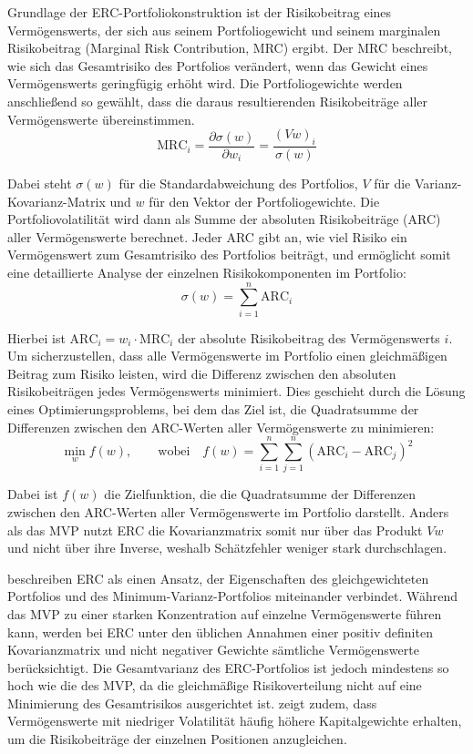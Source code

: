 \documentclass[a4paper, 12pt]{article}
\begin{document}
Grundlage der ERC-Portfoliokonstruktion ist der Risikobeitrag eines Vermögenswerts, der sich aus seinem Portfoliogewicht und seinem marginalen Risikobeitrag (Marginal Risk Contribution, MRC) ergibt.
Der MRC beschreibt, wie sich das Gesamtrisiko des Portfolios verändert, wenn das Gewicht eines Vermögenswerts geringfügig erhöht wird.
Die Portfoliogewichte werden anschließend so gewählt, dass die daraus resultierenden Risikobeiträge aller Vermögenswerte übereinstimmen.
\begin{equation}
	\mathrm{MRC}_i = \frac{\partial \sigma(w)}{\partial w_i} = \frac{(V w)_i}{\sigma(w)}
	\label{eq:erc-mrc}
\end{equation}

Dabei steht $\sigma(w)$ für die Standardabweichung des Portfolios, $V$ für die Varianz-Kovarianz-Matrix und $w$ für den Vektor der Portfoliogewichte.
Die Portfoliovolatilität wird dann als Summe der absoluten Risikobeiträge (ARC) aller Vermögenswerte berechnet.
Jeder ARC gibt an, wie viel Risiko ein Vermögenswert zum Gesamtrisiko des Portfolios beiträgt, und ermöglicht somit eine detaillierte Analyse der einzelnen Risikokomponenten im Portfolio:
\begin{equation}
	\sigma(w) = \sum_{i=1}^{n} \mathrm{ARC}_i
	\label{eq:erc-arc}
\end{equation}

Hierbei ist $\mathrm{ARC}_i = w_i \cdot \mathrm{MRC}_i$ der absolute Risikobeitrag des Vermögenswerts $i$.
Um sicherzustellen, dass alle Vermögenswerte im Portfolio einen gleichmäßigen Beitrag zum Risiko leisten, wird die Differenz zwischen den absoluten Risikobeiträgen jedes Vermögenswerts minimiert.
Dies geschieht durch die Lösung eines Optimierungsproblems, bei dem das Ziel ist, die Quadratsumme der Differenzen zwischen den ARC-Werten aller Vermögenswerte zu minimieren:
\begin{equation}
	\min_{w} f(w), \qquad \text{wobei} \quad f(w) = \sum_{i=1}^{n}\sum_{j=1}^{n}\left(\mathrm{ARC}_i - \mathrm{ARC}_j\right)^2
	\label{eq:erc-ziel}
\end{equation}

Dabei ist $f(w)$ die Zielfunktion, die die Quadratsumme der Differenzen zwischen den ARC-Werten aller Vermögenswerte im Portfolio darstellt.
Anders als das MVP nutzt ERC die Kovarianzmatrix somit nur über das Produkt $V w$ und nicht über ihre Inverse, weshalb Schätzfehler weniger stark durchschlagen.

\textcite{maillard2010} beschreiben ERC als einen Ansatz, der Eigenschaften des gleichgewichteten Portfolios und des Minimum-Varianz-Portfolios miteinander verbindet.
Während das MVP zu einer starken Konzentration auf einzelne Vermögenswerte führen kann, werden bei ERC unter den üblichen Annahmen einer positiv definiten Kovarianzmatrix und nicht negativer Gewichte sämtliche Vermögenswerte berücksichtigt.
Die Gesamtvarianz des ERC-Portfolios ist jedoch mindestens so hoch wie die des MVP, da die gleichmäßige Risikoverteilung nicht auf eine Minimierung des Gesamtrisikos ausgerichtet ist.
\textcite{lee2011} zeigt zudem, dass Vermögenswerte mit niedriger Volatilität häufig höhere Kapitalgewichte erhalten, um die Risikobeiträge der einzelnen Positionen anzugleichen.
\end{document}
